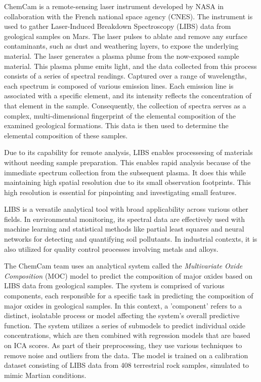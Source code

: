 ChemCam is a remote-sensing laser instrument developed by NASA in collaboration with the French national space agency (CNES).
The instrument is used to gather Laser-Induced Breakdown Spectroscopy (LIBS) data from geological samples on Mars.
The laser pulses to ablate and remove any surface contaminants, such as dust and weathering layers, to expose the underlying material.
The laser generates a plasma plume from the now-exposed sample material.
This plasma plume emits light, and the data collected from this process consists of a series of spectral readings.
Captured over a range of wavelengths, each spectrum is composed of various emission lines.
Each emission line is associated with a specific element, and its intensity reflects the concentration of that element in the sample.
Consequently, the collection of spectra serves as a complex, multi-dimensional fingerprint of the elemental composition of the examined geological formations.
This data is then used to determine the elemental composition of these samples.\cite{cleggRecalibrationMarsScience2017}

Due to its capability for remote analysis, LIBS enables processesing of materials without needing sample preparation. This enables rapid analysis because of the immediate spectrum collection from the subsequent plasma. It does this while maintaining high spatial resolution due to its small observation footprints. This high resolution is essential for pinpointing and investigating small features. \cite{wiensChemcam2012}

LIBS is a versatile analytical tool with broad applicability across various other fields. In environmental monitoring, its spectral data are effectively used with machine learning and statistical methods like partial least squares and neural networks for detecting and quantifying soil pollutants. In industrial contexts, it is also utilized for quality control processes involving metals and alloys\cite{huang_progress_2023}.

The ChemCam team uses an analytical system called the \textit{Multivariate Oxide Composition} (MOC) model to predict the composition of major oxides based on LIBS data from geological samples.
The system is comprised of various components, each responsible for a specific task in predicting the composition of major oxides in geological samples.
In this context, a 'component' refers to a distinct, isolatable process or model affecting the system's overall predictive function.
The system utilizes a series of submodels to predict individual oxide concentrations, which are then combined with regression models that are based on ICA scores.
As part of their preprocessing, they use various techniques to remove noise and outliers from the data.\cite{cleggRecalibrationMarsScience2017}
The model is trained on a calibration dataset consisting of LIBS data from 408 terrestrial rock samples, simulated to mimic Martian conditions\cite{cleggRecalibrationMarsScience2017}.

